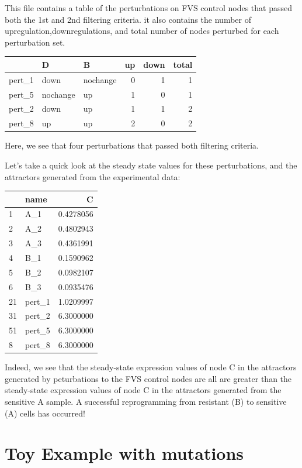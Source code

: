 \documentclass[
]{book}
\begin{document}
This file contains a table of the perturbations on FVS control nodes that passed both the 1st and 2nd filtering criteria. it also contains the number of upregulation,downregulations, and total number of nodes perturbed for each perturbation set.

\begin{tabular}{l|l|l|r|r|r}
\hline
  & D & B & up & down & total\\
\hline
pert\_1 & down & nochange & 0 & 1 & 1\\
\hline
pert\_5 & nochange & up & 1 & 0 & 1\\
\hline
pert\_2 & down & up & 1 & 1 & 2\\
\hline
pert\_8 & up & up & 2 & 0 & 2\\
\hline
\end{tabular}

Here, we see that four perturbations that passed both filtering criteria.

Let's take a quick look at the steady state values for these perturbations, and the attractors generated from the experimental data:

\begin{tabular}{l|l|r}
\hline
  & name & C\\
\hline
1 & A\_1 & 0.4278056\\
\hline
2 & A\_2 & 0.4802943\\
\hline
3 & A\_3 & 0.4361991\\
\hline
4 & B\_1 & 0.1590962\\
\hline
5 & B\_2 & 0.0982107\\
\hline
6 & B\_3 & 0.0935476\\
\hline
21 & pert\_1 & 1.0209997\\
\hline
31 & pert\_2 & 6.3000000\\
\hline
51 & pert\_5 & 6.3000000\\
\hline
8 & pert\_8 & 6.3000000\\
\hline
\end{tabular}

Indeed, we see that the steady-state expression values of node C in the attractors generated by peturbations to the FVS control nodes are all are greater than the steady-state expression values of node C in the attractors generated from the sensitive A sample. A successful reprogramming from resistant (B) to sensitive (A) cells has occurred!

\hypertarget{toy-example-with-mutations}{%
\section{Toy Example with mutations}\label{toy-example-with-mutations}}
\end{document}
